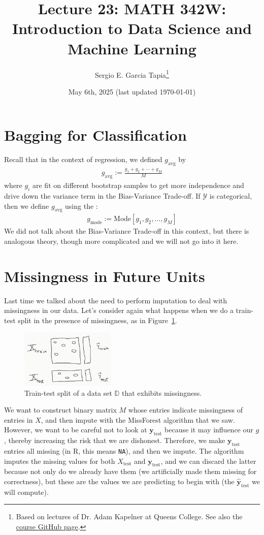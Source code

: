 \documentclass[12pt, a4paper]{article}
\title{Lecture 23: MATH 342W: Introduction to Data Science and Machine Learning}
\author{Sergio E. Garcia Tapia\thanks{Based on lectures of Dr. Adam Kapelner at Queens College.
See also the \href{https://github.com/kapelner/QC_MATH_342W_Spring_2025}{course GitHub page}.}}
\date{May 6th, 2025 (last updated \today)}
\theoremstyle{definition}
\begin{document}
	\maketitle
	\section{Bagging for Classification}
	Recall that in the context of regression, we defined $g_{\text{avg}}$ by
	\begin{align*}
		g_{\text{avg}} := \frac{g_1 + g_2 + \cdots + g_M}{M}
	\end{align*}
	where $g_i$ are fit on different bootstrap samples to get more independence
	and drive down the variance term in the Bias-Variance Trade-off. If
	$\mathcal{Y}$ is categorical, then we define $g_{\text{avg}}$ using
	the :
	\begin{align*}
		g_{\text{mode}} := \text{Mode}[g_1, g_2, \ldots,g_M]
	\end{align*}
	We did not talk about the Bias-Variance Trade-off in this context, but there
	is analogous theory, though more complicated and we will not go into it here.
	\section{Missingness in Future Units}
	Last time we talked about the need to perform imputation to deal with missingness
	in our data. Let's consider again what happens when we do a train-test split
	in the presence of missingness, as in Figure~\ref{fig:train-test-missing}.
	\begin{figure}
		\centering
		\includegraphics[width=0.4\textwidth]{train-test-split-missingness}
		\caption{Train-test split of a data set $\mathbb{D}$ that exhibits
		missingness.}
		\label{fig:train-test-missing}
	\end{figure}
	We want to construct binary matrix $M$ whose entries indicate missingness of entries
	in $X$, and then impute with the MissForest algorithm that we saw. However,
	we want to be careful not to look at $\bm{y}_{\text{test}}$ because it may
	influence our $g$, thereby increasing the risk that we are dishonest. Therefore,
	we make $\bm{y}_{\text{test}}$ entries all missing (in R, this means \texttt{NA}),
	and then we impute. The algorithm imputes the missing values for both $X_{\text{test}}$
	and $\bm{y}_{\text{test}}$, and we can discard the latter because not only do
	we already have them (we artificially made them missing for correctness), but
	these are the values we are predicting to begin with (the $\hat{\bm{y}}_{\text{test}}$
	we will compute).
	
\end{document}
